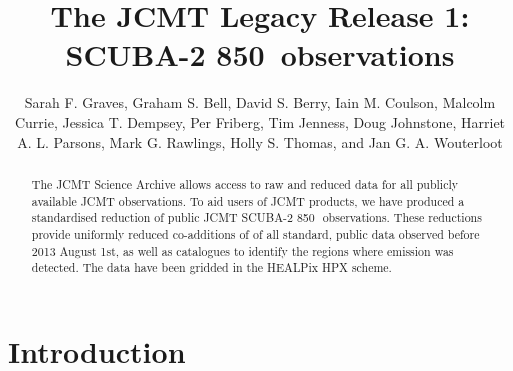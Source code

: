 \documentclass[twocolumn]{aastex6}
\newcommand{\um}{\micron}
\begin{document}
\title{The JCMT Legacy Release 1: SCUBA-2 850\micron\ observations}

\author{Sarah F. Graves,
     Graham S. Bell,
     David S. Berry,
     Iain M. Coulson,
     Malcolm Currie,
     Jessica T. Dempsey,
     Per Friberg,
     Tim Jenness,
     Doug Johnstone,
     Harriet A. L. Parsons,
     Mark G. Rawlings,
     Holly S. Thomas,
    and Jan G. A. Wouterloot
}

\begin{abstract}
  The JCMT Science Archive allows access to raw and reduced data for
  all publicly available JCMT observations. To aid users of JCMT
  products, we have produced a standardised reduction of public JCMT
  SCUBA-2 850\,\um\ observations. These reductions provide
  uniformly reduced co-additions of of all standard, public data
  observed before 2013 August 1st, as well as catalogues to identify
  the regions where emission was detected. The data have been gridded
  in the HEALPix HPX scheme.
\end{abstract}


\section{Introduction}
\end{document}
